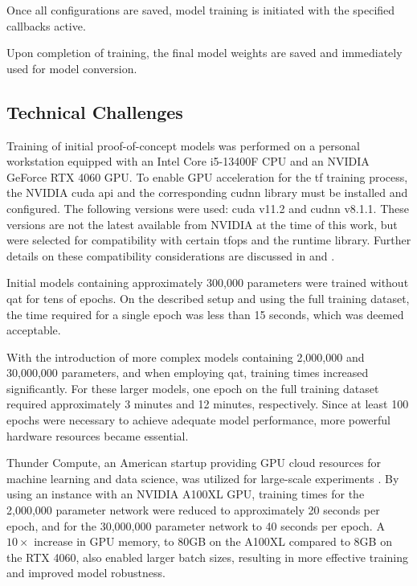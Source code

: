 {Once all configurations are saved, model training is initiated with the specified callbacks active.

Upon completion of training, the final model weights are saved and immediately used for model conversion.

\subsection*{Technical Challenges}

Training of initial proof-of-concept models was performed on a personal workstation equipped with an Intel Core i5-13400F CPU and an NVIDIA GeForce RTX 4060 GPU.
To enable GPU acceleration for the \gls{tf} training process, the NVIDIA \gls{cuda} \gls{api} and the corresponding \gls{cudnn} library must be installed and configured.
The following versions were used: \gls{cuda} v11.2 and \gls{cudnn} v8.1.1.
These versions are not the latest available from NVIDIA at the time of this work, but were selected for compatibility with certain \glspl{tfop} and the  runtime library.
Further details on these compatibility considerations are discussed in  and .

Initial models containing approximately 300,000 parameters were trained without \gls{qat} for tens of epochs.
On the described setup and using the full training dataset, the time required for a single epoch was less than 15 seconds, which was deemed acceptable.


With the introduction of more complex models containing 2,000,000 and 30,000,000 parameters, and when employing \gls{qat}, training times increased significantly.
For these larger models, one epoch on the full training dataset required approximately 3 minutes and 12 minutes, respectively.
Since at least 100 epochs were necessary to achieve adequate model performance, more powerful hardware resources became essential.

Thunder Compute, an American startup providing GPU cloud resources for machine learning and data science, was utilized for large-scale experiments \cite{thundercompute}.
By using an instance with an NVIDIA A100XL GPU, training times for the 2,000,000 parameter network were reduced to approximately 20 seconds per epoch,
and for the 30,000,000 parameter network to 40 seconds per epoch.
A \ensuremath{10\times} increase in GPU memory, to 80GB on the A100XL compared to 8GB on the RTX 4060, also enabled larger batch sizes,
resulting in more effective training and improved model robustness.

}
